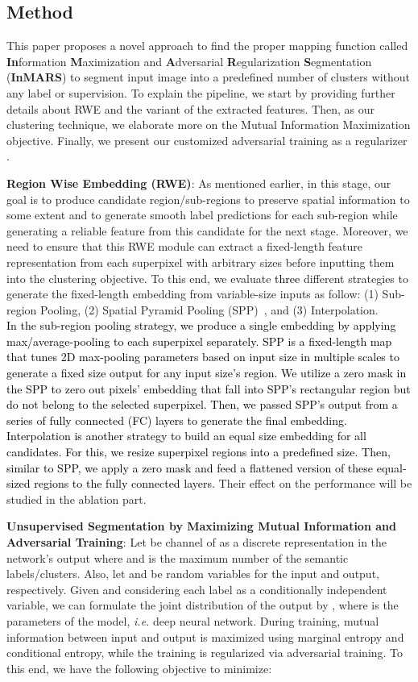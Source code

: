 \documentclass[letterpaper, 10 pt, journal, twoside]{IEEEtran}
\newcommand{\ie}{\emph{i.e.}\xspace}
\newcommand{\revised}{\textcolor{black}}{}
\begin{document}
\subsection{Method} This paper proposes a novel approach to find the proper mapping function called \textbf{In}formation \textbf{M}aximization and \textbf{A}dversarial \textbf{R}egularization \textbf{S}egmentation (\textbf{InMARS}) to segment input image into a predefined number of clusters without any label or supervision. To explain the pipeline, we start by providing further details about RWE and the variant of the extracted features. Then, as our clustering technique, we elaborate more on the Mutual Information Maximization objective. Finally, we present our customized adversarial training as a regularizer .

\textbf{Region Wise Embedding (RWE)}:
As mentioned earlier, in this stage, our goal is to produce candidate region/sub-regions to preserve spatial information to some extent and to generate smooth label predictions for each sub-region while generating a reliable feature from this candidate for the next stage. Moreover, we need to ensure that this RWE module can extract a fixed-length feature representation from each superpixel with arbitrary sizes before inputting them into the clustering objective. To this end, we evaluate \revised{three} different strategies to generate the fixed-length embedding from variable-size inputs as follow: (1) Sub-region Pooling, (2) Spatial Pyramid Pooling (SPP)~\cite{SPP}, and (3) Interpolation.\\ \revised{In the sub-region pooling strategy, we produce a single embedding by applying max/average-pooling to each superpixel separately. SPP is a fixed-length map that tunes 2D max-pooling parameters based on input size in multiple scales to generate a fixed size output for any input size's region. We utilize a zero mask in the SPP to zero out pixels' embedding that fall into SPP's rectangular region but do not belong to the selected superpixel. Then, we passed SPP's output from a series of fully connected (FC) layers to generate the final embedding. Interpolation is another strategy to build an equal size embedding for all candidates. For this, we resize superpixel regions into a predefined size. Then, similar to SPP, we apply a zero mask and feed a flattened version of these equal-sized regions to the fully connected layers.} Their effect on the performance will be studied in the ablation part.

\textbf{Unsupervised Segmentation by Maximizing Mutual Information and Adversarial Training}: 
Let  be  channel of  as a discrete representation in the network's output where  and  is the maximum number of the semantic labels/clusters. Also, let  and  be random variables for the input and output, respectively. Given  and considering each label as a conditionally independent variable, we can formulate the joint distribution of the output by , where  is the parameters of the model, \ie deep neural network. During training, mutual information between input  and output  is maximized using marginal entropy and conditional entropy, while the training is regularized via adversarial training. To this end, we have the following objective to minimize:
\end{document}
